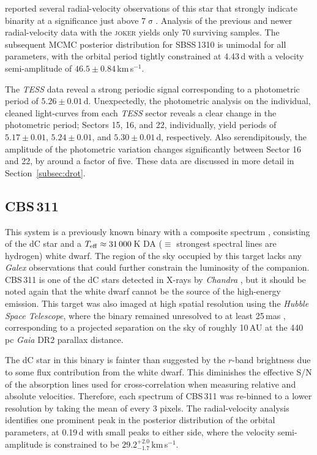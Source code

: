 \documentclass[fleqn,usenatbib,useAMS]{mnras}
\begin{document}
\citet{Whitehouse18} reported several radial-velocity observations of this star that strongly indicate binarity at a significance just above $7\upsigma$.  Analysis of the previous and newer radial-velocity data with the \textsc{joker} yields only 70 surviving samples.  The subsequent MCMC posterior distribution for SBSS\,1310 is unimodal for all parameters, with the orbital period tightly constrained at 4.43\,d with a velocity semi-amplitude of $46.5\pm0.84$\,km\,s$^{-1}$.

The {\em TESS} data reveal a strong periodic signal corresponding to a photometric period of $5.26 \pm 0.01$\,d.  Unexpectedly, the photometric analysis on the individual, cleaned light-curves from each {\em TESS} sector reveals a clear change in the photometric period; Sectors 15, 16, and 22, individually, yield periods of $5.17 \pm 0.01$, $5.24 \pm 0.01$, and $5.30 \pm 0.01$\,d, respectively.  Also serendipitously, the amplitude of the photometric variation changes significantly between Sector 16 and 22, by around a factor of five.  These data are discussed in more detail in Section~\ref{subsec:drot}.



\subsection{CBS\,311}

This system is a previously known binary with a composite spectrum \citep{Liebert1994}, consisting of the dC star and a $T_{\rm eff}\approx31\,000\,$K DA ($\equiv$ strongest spectral lines are hydrogen) white dwarf.  The region of the sky occupied by this target lacks any {\em Galex} observations that could further constrain the luminosity of the companion.  CBS\,311 is one of the dC stars detected in X-rays by {\em Chandra} \citep{Green19}, but it should be noted again that the white dwarf cannot be the source of the high-energy emission.  This target was also imaged at high spatial resolution using the {\em Hubble Space Telescope}, where the binary remained unresolved to at least 25\,mas \citep{Farihi10}, corresponding to a projected separation on the sky of roughly 10\,AU at the 440\,pc {\em Gaia} DR2 parallax distance.  

The dC star in this binary is fainter than suggested by the $r$-band brightness due to some flux contribution from the white dwarf.  This diminishes the effective S/N of the absorption lines used for cross-correlation when measuring relative and absolute velocities.  Therefore, each spectrum of CBS\,311 was re-binned to a lower resolution by taking the mean of every 3 pixels.  The radial-velocity analysis identifies one prominent peak in the posterior distribution of the orbital parameters, at 0.19\,d with small peaks to either side, where the velocity semi-amplitude is constrained to be $29.2^{+2.0}_{-1.7}$\,km\,s$^{-1}$.  
\end{document}
